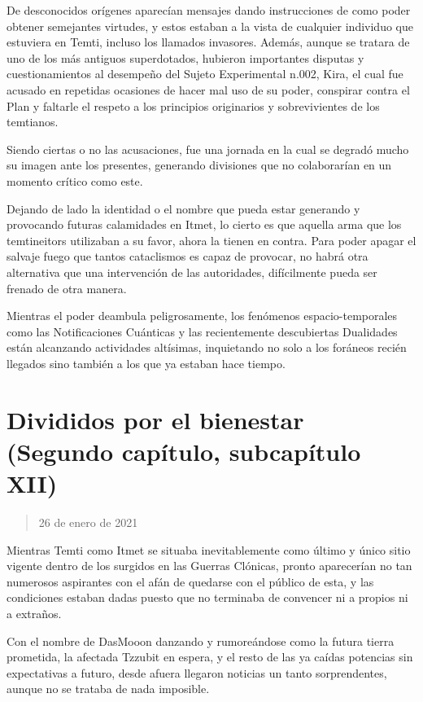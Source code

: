 \documentclass[
  spanish,
]{book}
\begin{document}
De desconocidos orígenes aparecían mensajes dando instrucciones de como poder obtener semejantes virtudes, y estos estaban a la vista de cualquier individuo que estuviera en Temti, incluso los llamados invasores. Además, aunque se tratara de uno de los más antiguos superdotados, hubieron importantes disputas y cuestionamientos al desempeño del Sujeto Experimental n.002, Kira, el cual fue acusado en repetidas ocasiones de hacer mal uso de su poder, conspirar contra el Plan y faltarle el respeto a los principios originarios y sobrevivientes de los temtianos.

Siendo ciertas o no las acusaciones, fue una jornada en la cual se degradó mucho su imagen ante los presentes, generando divisiones que no colaborarían en un momento crítico como este.

Dejando de lado la identidad o el nombre que pueda estar generando y provocando futuras calamidades en Itmet, lo cierto es que aquella arma que los temtineitors utilizaban a su favor, ahora la tienen en contra. Para poder apagar el salvaje fuego que tantos cataclismos es capaz de provocar, no habrá otra alternativa que una intervención de las autoridades, difícilmente pueda ser frenado de otra manera.

Mientras el poder deambula peligrosamente, los fenómenos espacio-temporales como las Notificaciones Cuánticas y las recientemente descubiertas Dualidades están alcanzando actividades altísimas, inquietando no solo a los foráneos recién llegados sino también a los que ya estaban hace tiempo.

\hypertarget{divididos-por-el-bienestar-segundo-capuxedtulo-subcapuxedtulo-xii}{%
\section{Divididos por el bienestar (Segundo capítulo, subcapítulo XII)}\label{divididos-por-el-bienestar-segundo-capuxedtulo-subcapuxedtulo-xii}}

\begin{quote}
26 de enero de 2021
\end{quote}

Mientras Temti como Itmet se situaba inevitablemente como último y único sitio vigente dentro de los surgidos en las Guerras Clónicas, pronto aparecerían no tan numerosos aspirantes con el afán de quedarse con el público de esta, y las condiciones estaban dadas puesto que no terminaba de convencer ni a propios ni a extraños.

Con el nombre de DasMooon danzando y rumoreándose como la futura tierra prometida, la afectada Tzzubit en espera, y el resto de las ya caídas potencias sin expectativas a futuro, desde afuera llegaron noticias un tanto sorprendentes, aunque no se trataba de nada imposible.
\end{document}
